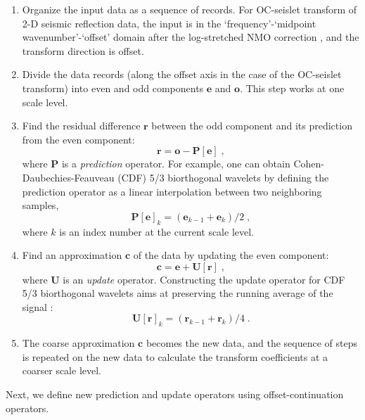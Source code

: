 \begin{enumerate}
\item Organize the input data as a sequence of records. For 
      OC-seislet transform of 2-D seismic reflection data, the input
      is in the `frequency'-`midpoint wavenumber'-`offset' domain
      after the log-stretched NMO correction \cite[]{Bolondi82},
      and the transform direction is offset.  
\item Divide the data records (along the offset axis in the case of the 
      OC-seislet transform) into even and odd components $\mathbf{e}$
      and $\mathbf{o}$. This step works at one scale level.
\item Find the residual difference $\mathbf{r}$ between the odd
      component and its prediction from the even component: 
   \begin{equation} 
   \label{eq:c}
  \mathbf{{r}} = \mathbf{{o}} - \mathbf{P[{e}]}\;, 
  \end{equation}
  where $\mathbf{P}$ is a \emph{prediction} operator. 
  For example, one can obtain Cohen-Daubechies-Feauveau (CDF) 5/3
  biorthogonal wavelets \cite[]{Cohen92} by defining the
  prediction operator as a linear interpolation between two neighboring
  samples,
  \begin{equation}
  \label{eq:p}
  \mathbf{P[e]}_k = \left(\mathbf{e}_{k-1} + \mathbf{e}_{k}\right)/2\;,
  \end{equation}
   where $k$ is an index number at the current scale level.
\item Find an approximation $\mathbf{c}$ of the data by updating
  the even component:
\begin{equation}
    \label{eq:r}
    \mathbf{{c}}  = \mathbf{{e}} + \mathbf{U[{r}]}\;,
  \end{equation}
where $\mathbf{U}$ is an \emph{update} operator. Constructing the
update operator for CDF 5/3 biorthogonal wavelets aims at preserving 
the running average of the signal
  \cite[]{athome}:
\begin{equation}
  \label{eq:u}
  \mathbf{U[r]}_k = \left(\mathbf{r}_{k-1} + \mathbf{r}_{k}\right)/4\;.
\end{equation}
\item The coarse approximation $\mathbf{{c}}$ becomes the new data,
  and the sequence of steps is repeated on the new data
    to calculate the transform coefficients at a coarser scale level.
\end{enumerate}
 
Next, we define new prediction and update operators using
offset-continuation operators.

